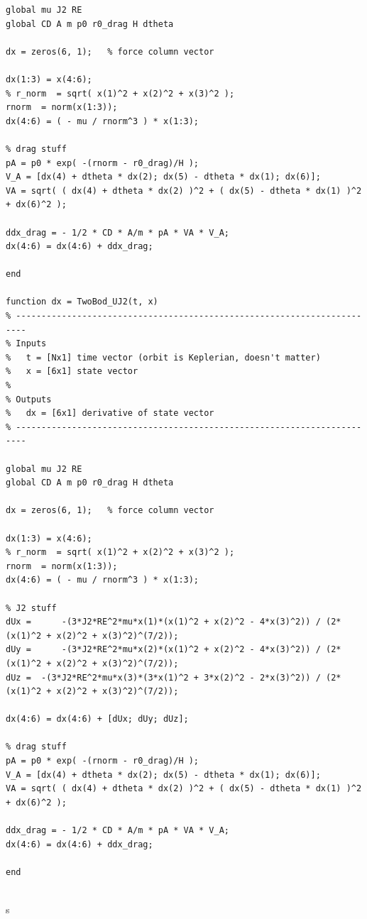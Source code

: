 \documentclass[conf]{new-aiaa}
\begin{document}
\begin{lstlisting}
global mu J2 RE 
global CD A m p0 r0_drag H dtheta 

dx = zeros(6, 1);   % force column vector 

dx(1:3) = x(4:6); 
% r_norm  = sqrt( x(1)^2 + x(2)^2 + x(3)^2 ); 
rnorm  = norm(x(1:3)); 
dx(4:6) = ( - mu / rnorm^3 ) * x(1:3); 

% drag stuff 
pA = p0 * exp( -(rnorm - r0_drag)/H ); 
V_A = [dx(4) + dtheta * dx(2); dx(5) - dtheta * dx(1); dx(6)]; 
VA = sqrt( ( dx(4) + dtheta * dx(2) )^2 + ( dx(5) - dtheta * dx(1) )^2 + dx(6)^2 ); 

ddx_drag = - 1/2 * CD * A/m * pA * VA * V_A; 
dx(4:6) = dx(4:6) + ddx_drag; 

end 

function dx = TwoBod_UJ2(t, x)
% ------------------------------------------------------------------------
% Inputs 
%   t = [Nx1] time vector (orbit is Keplerian, doesn't matter) 
%   x = [6x1] state vector 
% 
% Outputs 
%   dx = [6x1] derivative of state vector 
% ------------------------------------------------------------------------

global mu J2 RE 
global CD A m p0 r0_drag H dtheta 

dx = zeros(6, 1);   % force column vector 

dx(1:3) = x(4:6); 
% r_norm  = sqrt( x(1)^2 + x(2)^2 + x(3)^2 ); 
rnorm  = norm(x(1:3)); 
dx(4:6) = ( - mu / rnorm^3 ) * x(1:3); 

% J2 stuff 
dUx =      -(3*J2*RE^2*mu*x(1)*(x(1)^2 + x(2)^2 - 4*x(3)^2)) / (2*(x(1)^2 + x(2)^2 + x(3)^2)^(7/2)); 
dUy =      -(3*J2*RE^2*mu*x(2)*(x(1)^2 + x(2)^2 - 4*x(3)^2)) / (2*(x(1)^2 + x(2)^2 + x(3)^2)^(7/2)); 
dUz =  -(3*J2*RE^2*mu*x(3)*(3*x(1)^2 + 3*x(2)^2 - 2*x(3)^2)) / (2*(x(1)^2 + x(2)^2 + x(3)^2)^(7/2)); 

dx(4:6) = dx(4:6) + [dUx; dUy; dUz]; 

% drag stuff 
pA = p0 * exp( -(rnorm - r0_drag)/H ); 
V_A = [dx(4) + dtheta * dx(2); dx(5) - dtheta * dx(1); dx(6)]; 
VA = sqrt( ( dx(4) + dtheta * dx(2) )^2 + ( dx(5) - dtheta * dx(1) )^2 + dx(6)^2 ); 

ddx_drag = - 1/2 * CD * A/m * pA * VA * V_A; 
dx(4:6) = dx(4:6) + ddx_drag; 

end 
	
\end{lstlisting}


s
\end{document}
